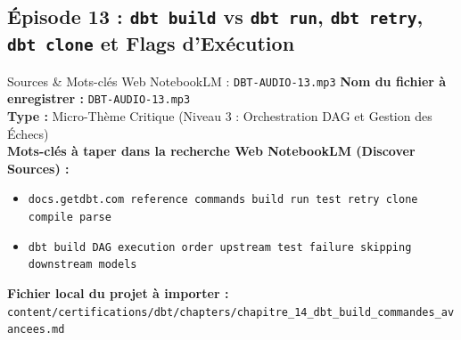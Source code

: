 \documentclass[11pt,a4paper]{article}
\begin{document}
\subsection{Épisode 13 : \texttt{dbt build} vs \texttt{dbt run}, \texttt{dbt retry}, \texttt{dbt clone} et Flags d'Exécution}
\begin{sourcebox}{Sources \& Mots-clés Web NotebookLM : \texttt{DBT-AUDIO-13.mp3}}
\textbf{Nom du fichier à enregistrer :} \texttt{DBT-AUDIO-13.mp3}\\
\textbf{Type :} Micro-Thème Critique (Niveau 3 : Orchestration DAG et Gestion des Échecs)\\
\textbf{Mots-clés à taper dans la recherche Web NotebookLM (Discover Sources) :}
\begin{itemize}[noitemsep]
    \item \texttt{docs.getdbt.com reference commands build run test retry clone compile parse}
    \item \texttt{dbt build DAG execution order upstream test failure skipping downstream models}
\end{itemize}
\textbf{Fichier local du projet à importer :}
\texttt{content/certifications/dbt/chapters/chapitre_14_dbt_build_commandes_avancees.md}
\end{sourcebox}
\end{document}

